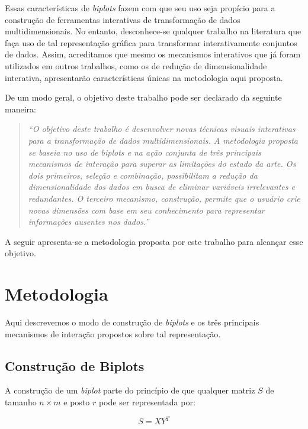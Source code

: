 Essas características de \emph{biplots} fazem com que seu uso seja
propício para a construção de ferramentas interativas de
transformação de dados multidimensionais. No entanto,
desconhece-se qualquer trabalho na literatura que faça uso
de tal representação gráfica para transformar
interativamente conjuntos de dados. Assim, acreditamos que
mesmo os mecanismos interativos que já foram utilizados em
outros trabalhos, como os de redução de dimensionalidade
interativa, apresentarão características únicas na
metodologia aqui proposta.

De um modo geral, o objetivo deste trabalho pode ser
declarado da seguinte maneira:

\begin{quote} \emph{``O objetivo deste trabalho é
        desenvolver novas técnicas visuais interativas para
        a transformação de dados multidimensionais. A
        metodologia proposta se baseia no uso de biplots e
        na ação conjunta de três principais mecanismos de
        interação para superar as limitações do estado da
        arte. Os dois primeiros, seleção e combinação,
        possibilitam a redução da dimensionalidade dos dados
        em busca de eliminar variáveis irrelevantes e
        redundantes. O terceiro mecanismo, construção,
    permite que o usuário crie novas dimensões com base em
seu conhecimento para representar informações ausentes nos
dados.''}
\end{quote}

A seguir apresenta-se a metodologia proposta por este
trabalho para alcançar esse objetivo. 

\section{Metodologia}

Aqui descrevemos o modo de construção de \emph{biplots} e os três
principais mecanismos de interação propostos sobre tal
representação. 

\subsection{Construção de Biplots}

A construção de um \emph{biplot} parte do princípio de que qualquer
matriz $S$ de tamanho $n \times m$ e posto $r$  pode
ser representada por:

\begin{equation}\label{eq:bp}
    S = XY^T
\end{equation}


